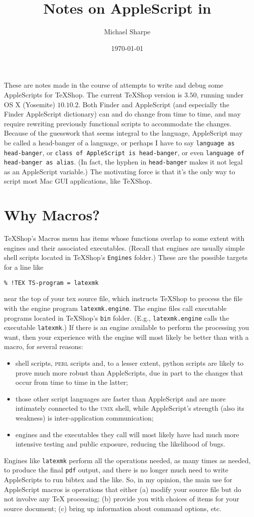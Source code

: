 \documentclass[11pt]{amsart}
\title{Notes on AppleScript in \TeXShop}
\author{Michael Sharpe}
\date{\today}  %
\def\TeXShop{\TeX Shop\xspace}
\def\UNIX{\textsc{unix}\xspace}
\begin{document}
\maketitle
These are notes made in the course of attempts to write and debug some AppleScripts for  \TeXShop. The current \TeXShop version is $3.50$, running  under OS X (Yosemite) $10.10.2$. Both Finder and AppleScript (and especially the Finder AppleScript dictionary) can and do change from time to time, and may require rewriting previously functional scripts to accommodate the changes. Because of the guesswork that seems integral to the language, AppleScript may be called a head-banger of a language, or perhaps I have to say  {\tt language as head-banger}, or {\tt class of AppleScript is head-banger}, or even {\tt language of head-banger as alias}.  (In fact, the hyphen in {\tt head-banger} makes it not legal as an AppleScript variable.) The motivating force is that it's the only way to script most Mac GUI applications, like \TeXShop.

\section{Why Macros?}
\TeXShop's Macros menu has items whose functions overlap to some extent with engines and their associated executables. (Recall that engines are usually simple shell scripts located in \TeXShop's {\tt Engines} folder.)  These are the possible targets for a line like
\begin{verbatim}
% !TEX TS-program = latexmk
\end{verbatim}
near the top of your tex source file, which instructs \TeXShop to process the file with the engine program {\tt latexmk.engine}. The engine files call executable programs located in \TeXShop's {\tt bin} folder. (E.g., {\tt latexmk.engine} calls the executable {\tt latexmk}.)  If there is an engine available to perform the processing you want, then your experience with the engine will most likely be better than with a macro, for several reasons:
\begin{itemize}
\item
shell scripts, \textsc{perl} scripts and, to a lesser extent, python scripts are likely to prove much more robust than AppleScripts, due in part to the changes that occur from time to time in the latter;
\item those other script languages are faster than AppleScript and are more intimately connected to the \UNIX shell, while AppleScript's strength (also its weakness) is inter-application communication;
\item engines and the executables they call will most likely have had much more intensive testing and public exposure, reducing the likelihood of bugs.
\end{itemize}
Engines like {\tt latexmk} perform all the operations needed, as many times as needed, to produce the final {\tt pdf} output, and there is no longer much need to write AppleScripts to run bibtex and the like. So, in my opinion, the main use for AppleScript macros is operations that either (a) modify your source file but do not involve any TeX processing; (b) provide you with  choices of items for your source document; (c) bring up information about command options, etc.
\end{document}
